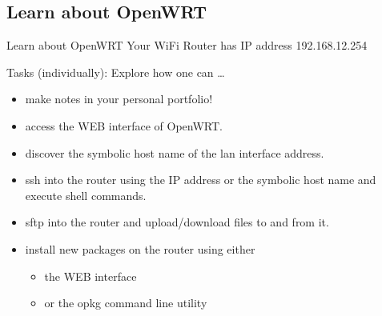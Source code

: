 ﻿\subsection{Learn about OpenWRT}

\begin{frame}{Learn about OpenWRT}
{Your WiFi Router has IP address 192.168.12.254}

\begin{exampleblock}{Tasks (individually): Explore how one can \ldots}
\begin{itemize}
  \item make \alert{notes} in your personal \alert{portfolio}!
  \item access the \alert{WEB interface} of OpenWRT.
  \item discover the \alert{symbolic host name} of the \alert{lan} interface address.
  \item \alert{ssh} into the router using the IP address or the symbolic host name and execute \alert{shell commands}.
  \item \alert{sftp} into the router and \alert{upload/download} files to and from it.
  \item install \alert{new packages} on the router using either
  \begin{itemize}
    \item the \alert{WEB interface}
    \item or the \alert{opkg} command line utility
  \end{itemize}
\end{itemize}
\end{exampleblock}
\end{frame}
